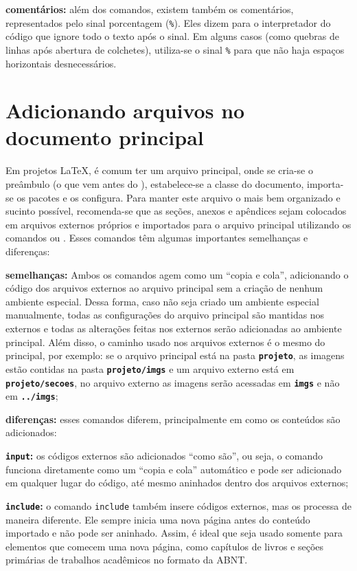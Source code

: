 \begin{alineas}
	\item \textbf{comentários:} além dos comandos, existem também os comentários, representados pelo sinal porcentagem (\texttt{\%}). Eles dizem para o interpretador do código que ignore todo o texto após o sinal. Em alguns casos (como quebras de linhas após abertura de colchetes), utiliza-se o sinal \texttt{\%} para que não haja espaços horizontais desnecessários.
\end{alineas}

\section{Adicionando arquivos no documento principal}

Em projetos \LaTeX, é comum ter um arquivo principal, onde se cria-se o preâmbulo (o que vem antes do \verb||), estabelece-se a classe do documento, importa-se os pacotes e os configura. Para manter este arquivo o mais bem organizado e sucinto possível, recomenda-se que as seções, anexos e apêndices sejam colocados em arquivos externos próprios e importados para o arquivo principal utilizando os comandos \verb*|| ou \verb*||. Esses comandos têm algumas importantes semelhanças e diferenças:

\begin{alineas}
	\item \textbf{semelhanças:} Ambos os comandos agem como um ``copia e cola'', adicionando o código dos arquivos externos ao arquivo principal sem a criação de nenhum ambiente especial. Dessa forma, caso não seja criado um ambiente especial manualmente, todas as configurações do arquivo principal são mantidas nos externos e todas as alterações feitas nos externos serão adicionadas ao ambiente principal. Além disso, o caminho usado nos arquivos externos é o mesmo do principal, por exemplo: se o arquivo principal está na pasta \textbf{\texttt{projeto}}, as imagens estão contidas na pasta \textbf{\texttt{projeto/imgs}} e um arquivo externo está em \textbf{\texttt{projeto/secoes}}, no arquivo externo as imagens serão acessadas em \textbf{\texttt{imgs}} e não em \textbf{\texttt{../imgs}};
	
	\item \textbf{diferenças:} esses comandos diferem, principalmente em como os conteúdos são adicionados:
	\begin{alineas}
		\item \textbf{\texttt{input}:} os códigos externos são adicionados ``como são'', ou seja, o comando funciona diretamente como um ``copia e cola'' automático e pode ser adicionado em qualquer lugar do código, até mesmo aninhados dentro dos arquivos externos;
		
		\item \textbf{\texttt{include}:} o comando \texttt{include} também insere códigos externos, mas os processa de maneira diferente. Ele sempre inicia uma nova página antes do conteúdo importado e não pode ser aninhado. Assim, é ideal que seja usado somente para elementos que comecem uma nova página, como capítulos de livros e seções primárias de trabalhos acadêmicos no formato da ABNT.
	\end{alineas}
\end{alineas}

